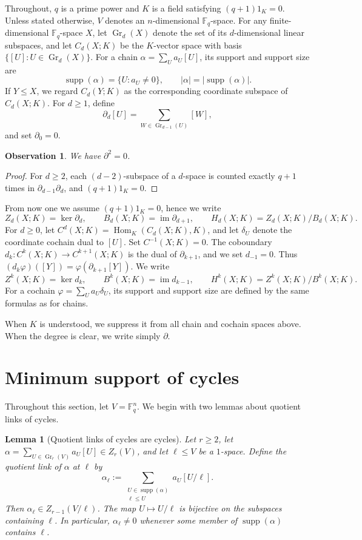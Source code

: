 \documentclass[11pt]{article}
\numberwithin{equation}{section}
\newtheorem{lemma}[theorem]{Lemma}
\newtheorem{observation}[theorem]{Observation}
\newcommand{\F}{\mathbb F}
\newcommand{\Gr}{\operatorname{Gr}}
\newcommand{\supp}{\operatorname{supp}}
\begin{document}
Throughout, $q$ is a prime power and $K$ is a field satisfying
$(q+1)1_K=0$. Unless stated otherwise, $V$ denotes an
$n$-dimensional $\F_q$-space. For any finite-dimensional
$\F_q$-space $X$, let $\Gr_d(X)$ denote the set of its
$d$-dimensional linear subspaces, and let $C_d(X;K)$ be the
$K$-vector space with basis $\{[U]:U\in\Gr_d(X)\}$. For a chain
$\alpha=\sum_Ua_U[U]$, its support and support size are
\[
    \supp(\alpha)=\{U:a_U\ne0\},
    \qquad
    |\alpha|=|\supp(\alpha)|.
\]
If $Y\le X$, we regard $C_d(Y;K)$ as the corresponding coordinate
subspace of $C_d(X;K)$.
For $d\ge1$, define
\[
    \partial_d[U]
    =
    \sum_{W\in\Gr_{d-1}(U)}[W],
\]
and set $\partial_0=0$. 
\begin{observation}
We have $\partial^2=0$.
\end{observation}
\begin{proof}
For $d\ge2$, each $(d-2)$-subspace of a $d$-space is counted exactly $q+1$ times in $\partial_{d-1}\partial_d$, and $(q+1)1_K=0$.
\end{proof}
\noindent From now one we assume $(q+1)1_K=0$, hence we write
\[
    Z_d(X;K)=\ker\partial_d,\qquad
    B_d(X;K)=\operatorname{im}\partial_{d+1},\qquad
    H_d(X;K)=Z_d(X;K)/B_d(X;K).
\]
For $d\ge0$, let
$C^d(X;K)=\operatorname{Hom}_K(C_d(X;K),K)$, and let $\delta_U$
denote the coordinate cochain dual to $[U]$. Set $C^{-1}(X;K)=0$.
The coboundary
$d_k:C^k(X;K)\to C^{k+1}(X;K)$ is the dual of
$\partial_{k+1}$, and we set $d_{-1}=0$. Thus
$(d_k\varphi)([Y])=\varphi(\partial_{k+1}[Y])$. We write
\[
    Z^k(X;K)=\ker d_k,\qquad
    B^k(X;K)=\operatorname{im}d_{k-1},\qquad
    H^k(X;K)=Z^k(X;K)/B^k(X;K).
\]
For a cochain $\varphi=\sum_Ua_U\delta_U$, its support and support
size are defined by the same formulas as for chains.

When $K$ is understood, we suppress it from all chain and cochain
spaces above. When the degree is clear, we write simply $\partial$.


\section{Minimum support of cycles}

Throughout this section, let $V=\F_q^n$. We begin with two lemmas about quotient links of cycles.

\begin{lemma}[Quotient links of cycles are cycles]\label{lem:link}
Let $r\ge2$, let
$\alpha=\sum_{U\in\Gr_r(V)}a_U[U]\in Z_r(V)$, and let
$\ell\le V$ be a $1$-space. Define the quotient link of $\alpha$ at
$\ell$ by
\[
 \alpha_\ell
 :=
 \sum_{\substack{U\in\supp(\alpha)\\ \ell\le U}}
 a_U[U/\ell].
\]
Then $\alpha_\ell\in Z_{r-1}(V/\ell)$.
The map $U\mapsto U/\ell$ is bijective on the subspaces containing
$\ell$. In particular, $\alpha_\ell\ne0$ whenever some member of
$\supp(\alpha)$ contains $\ell$. 
\end{lemma}
\end{document}
